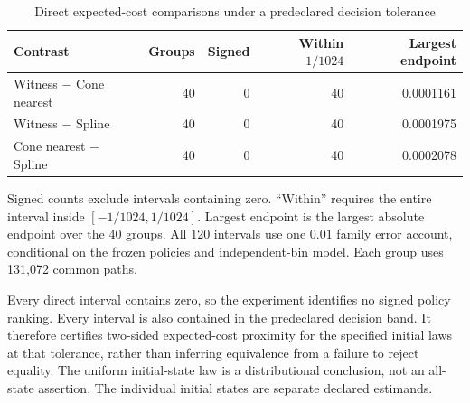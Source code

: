 \begin{table}[htbp]\centering
\caption{Direct expected-cost comparisons under a predeclared decision tolerance}\label{tab:direct47}
\begin{tabular}{lrrrr}\toprule
Contrast & Groups & Signed & Within $1/1024$ & Largest endpoint\\\midrule
Witness $-$ Cone nearest & 40 & 0 & 40 & 0.0001161 \\
Witness $-$ Spline & 40 & 0 & 40 & 0.0001975 \\
Cone nearest $-$ Spline & 40 & 0 & 40 & 0.0002078 \\
\bottomrule\end{tabular}
\par\smallskip\begin{minipage}{0.98\linewidth}\footnotesize Signed counts exclude intervals containing zero. ``Within'' requires the entire interval inside $[-1/1024,1/1024]$. Largest endpoint is the largest absolute endpoint over the 40 groups. All 120 intervals use one $0.01$ family error account, conditional on the frozen policies and independent-bin model. Each group uses 131,072 common paths.\end{minipage}\end{table}

Every direct interval contains zero, so the experiment identifies no signed policy ranking. Every interval is also contained in the predeclared decision band. It therefore certifies two-sided expected-cost proximity for the specified initial laws at that tolerance, rather than inferring equivalence from a failure to reject equality. The uniform initial-state law is a distributional conclusion, not an all-state assertion. The individual initial states are separate declared estimands.
